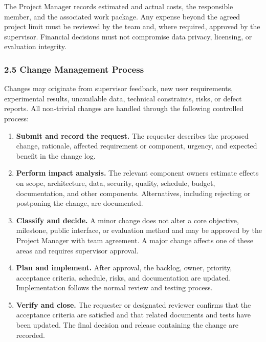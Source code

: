 \documentclass[11pt,a4paper]{article}
\begin{document}
The Project Manager records estimated and actual costs, the responsible member,
and the associated work package. Any expense beyond the agreed project limit
must be reviewed by the team and, where required, approved by the supervisor.
Financial decisions must not compromise data privacy, licensing, or evaluation
integrity.

\subsubsection{2.5 Change Management Process}

Changes may originate from supervisor feedback, new user requirements,
experimental results, unavailable data, technical constraints, risks, or defect
reports. All non-trivial changes are handled through the following controlled
process:

\begin{enumerate}
  \item \textbf{Submit and record the request.} The requester describes the
  proposed change, rationale, affected requirement or component, urgency, and
  expected benefit in the change log.

  \item \textbf{Perform impact analysis.} The relevant component owners estimate
  effects on scope, architecture, data, security, quality, schedule, budget,
  documentation, and other components. Alternatives, including rejecting or
  postponing the change, are documented.

  \item \textbf{Classify and decide.} A minor change does not alter a core
  objective, milestone, public interface, or evaluation method and may be
  approved by the Project Manager with team agreement. A major change affects
  one of these areas and requires supervisor approval.

  \item \textbf{Plan and implement.} After approval, the backlog, owner,
  priority, acceptance criteria, schedule, risks, and documentation are updated.
  Implementation follows the normal review and testing process.

  \item \textbf{Verify and close.} The requester or designated reviewer confirms
  that the acceptance criteria are satisfied and that related documents and
  tests have been updated. The final decision and release containing the change
  are recorded.
\end{enumerate}
\end{document}
